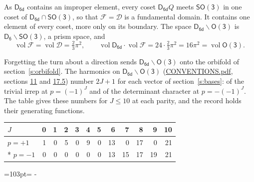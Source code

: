 \documentclass[10pt,a4paper]{article}
\newcommand{\needspace}[1]{\par\penalty-100\begingroup\dimen0=#1\relax\dimen2=\pagegoal
  \advance\dimen2-\pagetotal\ifdim\dimen0>\dimen2\relax\ifdim\dimen2>0pt\vfil\break\fi\fi
  \endgroup}
\numberwithin{equation}{section}
\newcommand{\grp}[1]{\mathsf{#1}}
\newcommand{\vol}{\operatorname{vol}}
\newcommand{\fcell}{\mathcal{D}}
\newcommand{\fdomain}{\mathcal{F}}
\begin{document}
\leavevmode\label{n:set.fundamental}As $\grp{D_{6d}}$ contains an improper element, every coset $\grp{D_{6d}}Q$ meets \href{SO3.pdf}{$\grp{SO(3)}$} in one coset of $\grp{D_{6d}} \cap \grp{SO(3)}$, so that $\fdomain = \fcell$ is a fundamental domain. It contains one element of every coset, more only on its boundary.
The space $\grp{D_{6d}}\backslash\grp{O(3)}$ is $\grp{D_{6}}\backslash\grp{SO(3)}$, a prism space, and
\begin{equation}\label{e:volume}\vol\fdomain = \vol\fcell = \tfrac{2}{3}\pi^2,\qquad \vol\grp{D_{6d}}\cdot\vol\fdomain = 24\cdot \tfrac{2}{3}\pi^2 = 16\pi^2 = \vol\grp{O(3)}.\end{equation}

Forgetting the turn about a direction sends $\grp{D_{6d}}\backslash\grp{O(3)}$ onto the orbifold of section~\ref{s:orbifold}.
The harmonics on $\grp{D_{6d}}\backslash\grp{O(3)}$ (\href{../../CONVENTIONS.pdf}{CONVENTIONS.pdf}, sections \href{../../CONVENTIONS.pdf\#conv.11}{11} and \href{../../CONVENTIONS.pdf\#conv.17.5}{17.5}) number $2J + 1$ for each vector of section~\ref{s:bases}: of the trivial irrep at $p = (-1)^J$ and of the determinant character at $p = -(-1)^J$. The table gives these numbers for $J \le 10$ at each parity, and the record holds their generating functions.
{\small\setlength{\tabcolsep}{4pt}\begin{longtable}{@{}lrrrrrrrrrrr@{}}\toprule
$J$ & 0 & 1 & 2 & 3 & 4 & 5 & 6 & 7 & 8 & 9 & 10\\\midrule\endhead
\bottomrule\endfoot\endlastfoot
$p = +1$ & 1 & 0 & 5 & 0 & 9 & 0 & 13 & 0 & 17 & 0 & 21\\*
$p = -1$ & 0 & 0 & 0 & 0 & 0 & 0 & 13 & 15 & 17 & 19 & 21\\
\bottomrule\end{longtable}}
\needspace{103pt}
\end{document}
